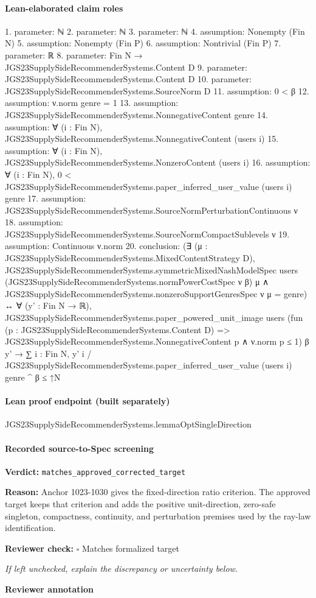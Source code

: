 \documentclass[10pt]{article}
\newcommand{\reviewerbox}{%
  \par\noindent\fbox{\parbox{0.96\linewidth}{\rule{0pt}{0.38in}}}\par
}
\newcommand{\reviewmatch}[1]{%
  \par\noindent\textbf{Reviewer check:} $\square$\; #1\par
  \noindent\emph{If left unchecked, explain the discrepancy or uncertainty below.}\par
}
\begin{document}
\paragraph{Lean-elaborated claim roles}\begin{ReviewVerbatim}
1. parameter: ℕ
2. parameter: ℕ
3. parameter: ℕ
4. assumption: Nonempty (Fin N)
5. assumption: Nonempty (Fin P)
6. assumption: Nontrivial (Fin P)
7. parameter: ℝ
8. parameter: Fin N → JGS23SupplySideRecommenderSystems.Content D
9. parameter: JGS23SupplySideRecommenderSystems.Content D
10. parameter: JGS23SupplySideRecommenderSystems.SourceNorm D
11. assumption: 0 < β
12. assumption: ν.norm genre = 1
13. assumption: JGS23SupplySideRecommenderSystems.NonnegativeContent genre
14. assumption: ∀ (i : Fin N), JGS23SupplySideRecommenderSystems.NonnegativeContent (users i)
15. assumption: ∀ (i : Fin N), JGS23SupplySideRecommenderSystems.NonzeroContent (users i)
16. assumption: ∀ (i : Fin N), 0 < JGS23SupplySideRecommenderSystems.paper_inferred_user_value (users i) genre
17. assumption: JGS23SupplySideRecommenderSystems.SourceNormPerturbationContinuous ν
18. assumption: JGS23SupplySideRecommenderSystems.SourceNormCompactSublevels ν
19. assumption: Continuous ν.norm
20. conclusion: (∃ (μ : JGS23SupplySideRecommenderSystems.MixedContentStrategy D),
    JGS23SupplySideRecommenderSystems.symmetricMixedNashModelSpec users
        (JGS23SupplySideRecommenderSystems.normPowerCostSpec ν β) μ ∧
      JGS23SupplySideRecommenderSystems.nonzeroSupportGenresSpec ν μ = {genre}) ↔
  ∀ (y' : Fin N → ℝ),
    JGS23SupplySideRecommenderSystems.paper_powered_unit_image users
        (fun (p : JGS23SupplySideRecommenderSystems.Content D) =>
          JGS23SupplySideRecommenderSystems.NonnegativeContent p ∧ ν.norm p ≤ 1)
        β y' →
      ∑ i : Fin N, y' i / JGS23SupplySideRecommenderSystems.paper_inferred_user_value (users i) genre ^ β ≤ ↑N
\end{ReviewVerbatim}

\paragraph{Lean proof endpoint (built separately)}\begin{ReviewVerbatim}
JGS23SupplySideRecommenderSystems.lemmaOptSingleDirection
\end{ReviewVerbatim}

\paragraph{Recorded source-to-Spec screening}
\textbf{Verdict:} \texttt{matches\_approved\_corrected\_target}
\\
{\raggedright
\textbf{Reason:} Anchor 1023-\allowbreak{}1030 gives the fixed-\allowbreak{}direction ratio criterion.\allowbreak{}  The approved target keeps that criterion and adds the positive unit-\allowbreak{}direction, zero-\allowbreak{}safe singleton, compactness, continuity, and perturbation premises used by the ray-\allowbreak{}law identification.\allowbreak{}
\par}
\reviewmatch{Matches formalized target}
\noindent\textbf{Reviewer annotation}\par
\reviewerbox
\clearpage
\hypertarget{source-claim-e310b935c96ac006}{}
\end{document}
